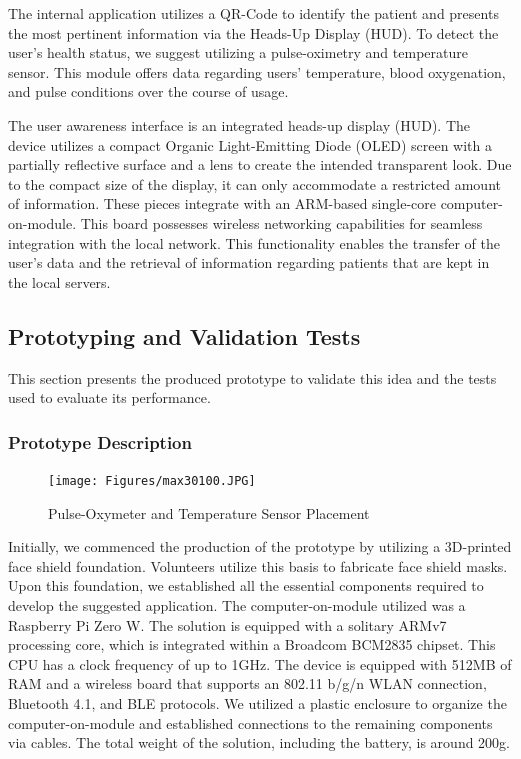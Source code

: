 The internal application utilizes a QR-Code to identify the patient and presents the most pertinent information via the Heads-Up Display (HUD). To detect the user's health status, we suggest utilizing a pulse-oximetry and temperature sensor. This module offers data regarding users' temperature, blood oxygenation, and pulse conditions over the course of usage. 

The user awareness interface is an integrated heads-up display (HUD). The device utilizes a compact Organic Light-Emitting Diode (OLED) screen with a partially reflective surface and a lens to create the intended transparent look. Due to the compact size of the display, it can only accommodate a restricted amount of information. These pieces integrate with an ARM-based single-core computer-on-module. This board possesses wireless networking capabilities for seamless integration with the local network. This functionality enables the transfer of the user's data and the retrieval of information regarding patients that are kept in the local servers. 

\subsection{{Prototyping and Validation Tests}}

This section presents the produced prototype to validate this idea and the tests used to evaluate its performance. 

\subsubsection{Prototype Description}

\begin{figure}[h!]
    \centering
    \texttt{[image: Figures/max30100.JPG]}
    \caption{Pulse-Oxymeter and Temperature Sensor Placement}
    \label{fig:max30100}
\end{figure}

Initially, we commenced the production of the prototype by utilizing a 3D-printed face shield foundation. Volunteers utilize this basis to fabricate face shield masks. Upon this foundation, we established all the essential components required to develop the suggested application. The computer-on-module utilized was a Raspberry Pi Zero W. The solution is equipped with a solitary ARMv7 processing core, which is integrated within a Broadcom BCM2835 chipset. This CPU has a clock frequency of up to 1GHz. The device is equipped with 512MB of RAM and a wireless board that supports an 802.11 b/g/n WLAN connection, Bluetooth 4.1, and BLE protocols. We utilized a plastic enclosure to organize the computer-on-module and established connections to the remaining components via cables. The total weight of the solution, including the battery, is around 200g.

